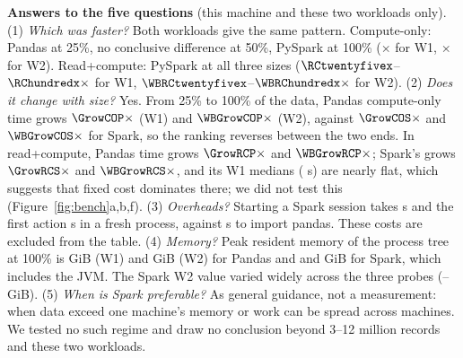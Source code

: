 \documentclass[acmtog,nonacm]{acmart}
\begin{document}
\textbf{Answers to the five questions} (this machine and these two workloads only).
(1) \emph{Which was faster?} Both workloads give the same pattern. Compute-only: Pandas at 25\%, no conclusive difference at 50\%, PySpark at 100\% (\COhundredx$\times$ for W1, \WBCOhundredx$\times$ for W2). Read+compute: PySpark at all three sizes ($\RCtwentyfivex$--$\RChundredx\times$ for W1, $\WBRCtwentyfivex$--$\WBRChundredx\times$ for W2).
(2) \emph{Does it change with size?} Yes. From 25\% to 100\% of the data, Pandas compute-only time grows $\GrowCOP\times$ (W1) and $\WBGrowCOP\times$ (W2), against $\GrowCOS\times$ and $\WBGrowCOS\times$ for Spark, so the ranking reverses between the two ends. In read+compute, Pandas time grows $\GrowRCP\times$ and $\WBGrowRCP\times$; Spark's grows $\GrowRCS\times$ and $\WBGrowRCS\times$, and its W1 medians (\SparkRCvals{} s) are nearly flat, which suggests that fixed cost dominates there; we did not test this (Figure~\ref{fig:bench}a,b,f).
(3) \emph{Overheads?} Starting a Spark session takes \SetupSession{} s and the first action \SetupFirst{} s in a fresh process, against \SetupImport{} s to import pandas. These costs are excluded from the table.
(4) \emph{Memory?} Peak resident memory of the process tree at 100\% is \MemPhundred{} GiB (W1) and \WBMemPhundred{} GiB (W2) for Pandas and \MemShundred{} and \WBMemShundred{} GiB for Spark, which includes the JVM. The Spark W2 value varied widely across the three probes (\WBMemSminhundred{}--\WBMemSmaxhundred{} GiB).
(5) \emph{When is Spark preferable?} As general guidance, not a measurement: when data exceed one machine's memory or work can be spread across machines. We tested no such regime and draw no conclusion beyond 3--12 million records and these two workloads.



\end{document}
